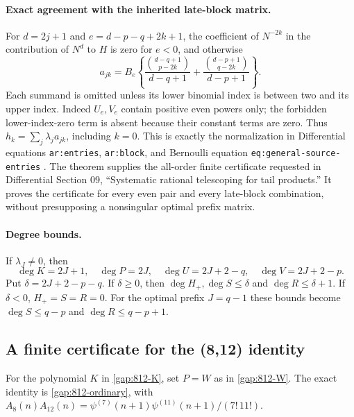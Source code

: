 \paragraph{Exact agreement with the inherited late-block matrix.}
For $d=2j+1$ and $e=d-p-q+2k+1$, the coefficient of $N^{-2k}$ in
the contribution of $N^d$ to $H$ is zero for $e<0$, and otherwise
\[
 a_{jk}=B_e\left\{
 \frac{\binom{d-q+1}{p-2k}}{d-q+1}
 +\frac{\binom{d-p+1}{q-2k}}{d-p+1}\right\}.
\]
Each summand is omitted unless its lower binomial index is between
two and its upper index. Indeed $U_e,V_e$ contain positive even powers
only; the forbidden lower-index-zero term is absent because their
constant terms are zero. Thus $h_k=\sum_j\lambda_j a_{jk}$,
including $k=0$. This is exactly the normalization in
Differential equations \texttt{ar:entries}, \texttt{ar:block}, and
Bernoulli equation \texttt{eq:general-source-entries} \cite{DPL,BTD}.
The theorem supplies the all-order finite certificate requested in
Differential Section 09, ``Systematic rational telescoping for tail
products.'' It proves the certificate for every even pair and every
late-block combination, without presupposing a nonsingular optimal
prefix matrix.

\paragraph{Degree bounds.}
If $\lambda_J\ne0$, then
\[
 \deg K=2J+1,\quad\deg P=2J,\quad
 \deg U=2J+2-q,\quad\deg V=2J+2-p.
\]
Put $\delta=2J+2-p-q$. If $\delta\ge0$, then
$\deg H_+,\deg S\le\delta$ and $\deg R\le\delta+1$.
If $\delta<0$, $H_+=S=R=0$.
For the optimal prefix $J=q-1$ these bounds become
$\deg S\le q-p$ and $\deg R\le q-p+1$.

\subsection{A finite certificate for the (8,12) identity}
\label{tel:812}
For the polynomial $K$ in \eqref{gap:812-K}, set $P=W$ as in
\eqref{gap:812-W}. The exact identity is
\eqref{gap:812-ordinary}, with
$A_8(n)A_{12}(n)=\psi^{(7)}(n+1)\psi^{(11)}(n+1)/(7!\,11!)$.

